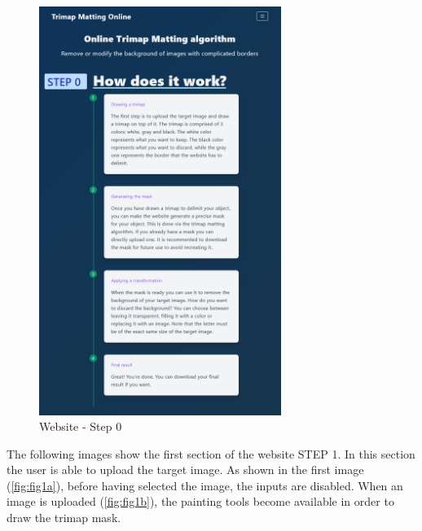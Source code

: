 \documentclass[a4paper]{article}
\begin{document}
\begin{figure}[ht]
    \centering
    \includegraphics[width=0.7\textwidth]{website/step0.png}
    \caption{Website - Step 0}
\end{figure}

\pagebreak

The following images show the first section
of the website \textsc{STEP 1}. In this section the user is able
to upload the target image.
As shown in the first image (\ref{fig:fig1a}),
before having selected the image,
the inputs are disabled.
When an image is uploaded (\ref{fig:fig1b}),
the painting tools become available
in order to draw the \gls{trimap} mask.
\end{document}
